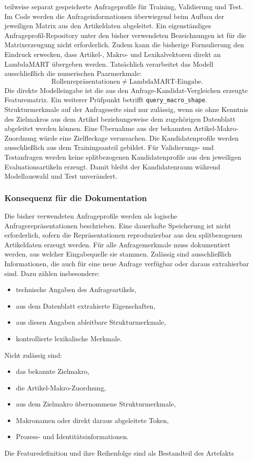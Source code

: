 teilweise separat gespeicherte Anfrageprofile für Training, Validierung und Test. Im Code werden die Anfrageinformationen überwiegend beim Aufbau der jeweiligen Matrix aus den Artikeldaten abgeleitet. Ein eigenständiges Anfrageprofil-Repository unter den bisher verwendeten Bezeichnungen ist für die Matrixerzeugung nicht erforderlich. Zudem kann die bisherige Formulierung den Eindruck erwecken, dass Artikel-, Makro- und Lexikalvektoren direkt an LambdaMART übergeben werden. Tatsächlich verarbeitet das Modell ausschließlich die numerischen Paarmerkmale: \begin{equation} \text{Rollenrepräsentationen} \neq \text{LambdaMART-Eingabe}. \label{eq:rollenrepraesentation_ungleich_modelleingabe} \end{equation} Die direkte Modelleingabe ist die aus den Anfrage-Kandidat-Vergleichen erzeugte Featurematrix. Ein weiterer Prüfpunkt betrifft \texttt{query\_macro\_shape}. Strukturmerkmale auf der Anfrageseite sind nur zulässig, wenn sie ohne Kenntnis des Zielmakros aus dem Artikel beziehungsweise dem zugehörigen Datenblatt abgeleitet werden können. Eine Übernahme aus der bekannten Artikel-Makro-Zuordnung würde eine Zielfleckage verursachen. Die Kandidatenprofile werden ausschließlich aus dem Trainingsanteil gebildet. Für Validierungs- und Testanfragen werden keine splitbezogenen Kandidatenprofile aus den jeweiligen Evaluationsartikeln erzeugt. Damit bleibt der Kandidatenraum während Modellauswahl und Test unverändert. \subsubsection*{Konsequenz für die Dokumentation} Die bisher verwendeten Anfrageprofile werden als logische Anfragerepräsentationen beschrieben. Eine dauerhafte Speicherung ist nicht erforderlich, sofern die Repräsentationen reproduzierbar aus den splitbezogenen Artikeldaten erzeugt werden. Für alle Anfragemerkmale muss dokumentiert werden, aus welcher Eingabequelle sie stammen. Zulässig sind ausschließlich Informationen, die auch für eine neue Anfrage verfügbar oder daraus extrahierbar sind. Dazu zählen insbesondere: \begin{itemize} \item technische Angaben des Anfrageartikels, \item aus dem Datenblatt extrahierte Eigenschaften, \item aus diesen Angaben ableitbare Strukturmerkmale, \item kontrollierte lexikalische Merkmale. \end{itemize} Nicht zulässig sind: \begin{itemize} \item das bekannte Zielmakro, \item die Artikel-Makro-Zuordnung, \item aus dem Zielmakro übernommene Strukturmerkmale, \item Makronamen oder direkt daraus abgeleitete Token, \item Prozess- und Identitätsinformationen. \end{itemize} Die Featuredefinition und ihre Reihenfolge sind als Bestandteil des Artefakts 
